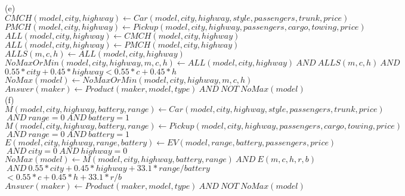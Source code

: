 \documentclass[11pt, oneside]{article}   	%
\begin{document}
(e)\\
$CMCH(model, city, highway) \gets Car(model, city, highway, style, passengers, trunk, price)$\\
$PMCH(model, city, highway) \gets Pickup(model, city, highway, passengers, cargo, towing, price)$\\
$ALL(model, city, highway)\gets CMCH(model, city, highway) $\\
$ALL(model, city, highway)\gets PMCH(model, city, highway)$\\
$ALLS(m, c, h) \gets ALL(model, city, highway)$\\
$NoMaxOrMin(model, city, highway, m, c, h) \gets ALL(model, city, highway)\ AND \  ALLS(m, c, h)\ AND \ $ 
\hspace*{8cm}$0.55*city+0.45*highway < 0.55*c + 0.45*h $\\
$NoMax(model) \gets NoMaxOrMin(model, city, highway, m, c, h)$\\
$Answer(maker) \gets Product(maker, model, type) \ AND \ NOT\ NoMax(model) $\\

(f)\\
$M(model, city, highway, battery, range) \gets Car(model, city, highway, style, passengers, trunk, price)$\\
\hspace*{7cm}$ \ AND\ range=0 \ AND \ battery=1$\\
$M(model, city, highway, battery, range) \gets Pickup(model, city, highway, passengers, cargo, towing, price)$\\
\hspace*{7cm}$ \ AND\ range=0 \ AND \ battery=1$\\
$E(model,city, highway, range, battery) \gets EV(model, range, battery, passengers, price) $\\
\hspace*{7cm}$ \ AND\ city=0 \ AND \ highway=0$\\
$NoMax(model) \gets M(model, city, highway, battery, range)\ AND \ E(m, c, h, r, b)$\\ 
\hspace*{3cm} $\ AND\ 0.55*city+0.45*highway + 33.1*range/battery $\\
\hspace*{3cm} $< 0.55*c+0.45*h + 33.1*r/b$\\
$Answer(maker) \gets Product(maker, model, type) \ AND \ NOT\ NoMax(model) $\\
\end{document}
